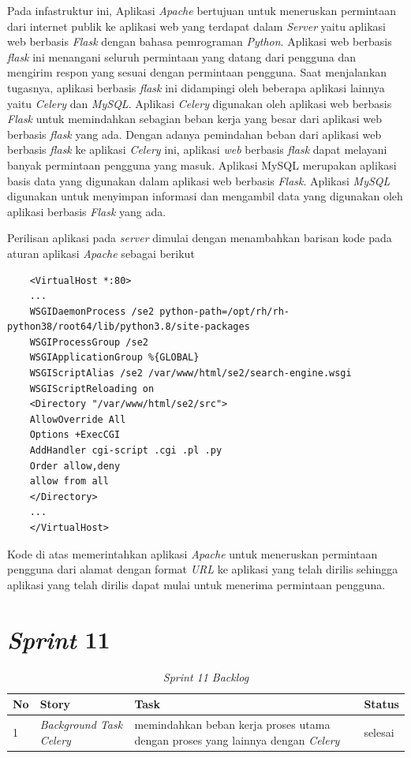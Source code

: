 Pada infastruktur ini, Aplikasi \textit{Apache} bertujuan untuk meneruskan permintaan dari internet publik ke aplikasi web yang terdapat dalam \textit{Server} yaitu aplikasi web berbasis \textit{Flask} dengan bahasa pemrograman \textit{Python}. Aplikasi web berbasis \textit{flask} ini menangani seluruh permintaan yang datang dari pengguna dan mengirim respon yang sesuai dengan permintaan pengguna. Saat menjalankan tugasnya, aplikasi berbasis \textit{flask} ini didampingi oleh beberapa aplikasi lainnya yaitu \textit{Celery} dan \textit{MySQL}. Aplikasi \textit{Celery} digunakan oleh aplikasi web berbasis \textit{Flask} untuk memindahkan sebagian beban kerja yang besar dari aplikasi web berbasis \textit{flask} yang ada. Dengan adanya pemindahan beban dari aplikasi web berbasis \textit{flask} ke aplikasi \textit{Celery} ini, aplikasi \textit{web} berbasis \textit{flask} dapat melayani banyak permintaan pengguna yang masuk. Aplikasi MySQL merupakan aplikasi basis data yang digunakan dalam aplikasi web berbasis \textit{Flask}. Aplikasi \textit{MySQL} digunakan untuk menyimpan informasi dan mengambil data yang digunakan oleh aplikasi berbasis \textit{Flask} yang ada.

Perilisan aplikasi pada \textit{server} dimulai dengan menambahkan barisan kode pada aturan aplikasi \textit{Apache} sebagai berikut

\begin{lstlisting}
	<VirtualHost *:80>
	...
	WSGIDaemonProcess /se2 python-path=/opt/rh/rh-python38/root64/lib/python3.8/site-packages
	WSGIProcessGroup /se2
	WSGIApplicationGroup %{GLOBAL}
	WSGIScriptAlias /se2 /var/www/html/se2/search-engine.wsgi
	WSGIScriptReloading on
	<Directory "/var/www/html/se2/src">
	AllowOverride All
	Options +ExecCGI
	AddHandler cgi-script .cgi .pl .py
	Order allow,deny
	allow from all
	</Directory>
	...
	</VirtualHost>
\end{lstlisting}

Kode di atas memerintahkan aplikasi \textit{Apache} untuk meneruskan permintaan pengguna dari alamat dengan format \textit{URL}  ke aplikasi yang telah dirilis sehingga aplikasi yang telah dirilis dapat mulai untuk menerima permintaan pengguna.

\section{\textit{Sprint} 11}

\begin{longtable}{@{}|p{0.5cm}|p{4cm}|p{6cm}|p{2cm}|@{}}
	\caption{\textit{Sprint 11 Backlog}}\\	
	\hline
	\textbf{No} & \textbf{Story} & \textbf{Task} & \textbf{Status} \\
	\hline
	1 & \textit{Background Task }\textit{Celery} & memindahkan beban kerja proses utama dengan proses yang lainnya dengan \textit{Celery} & selesai \\
	\cline{3-4}
	\hline
	
\end{longtable}

